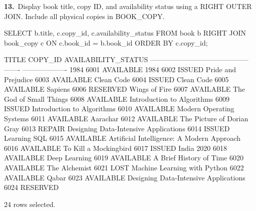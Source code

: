 \noindent\begin{minipage}{\linewidth}
\begingroup{}
{\fontsize{14}{17}\selectfont\textbf{13.}}\ Display book title, copy ID, and availability status using a RIGHT OUTER JOIN. Include all physical copies in BOOK\_COPY.\par
\endgroup\vspace{12pt}


\begin{sqlcode}
SELECT b.title, c.copy_id, c.availability_status
FROM book b
RIGHT JOIN book_copy c ON c.book_id = b.book_id
ORDER BY c.copy_id;
\end{sqlcode}

\vspace{18pt}


\begin{sqlout}[fontsize=\small]
TITLE                                       COPY_ID  AVAILABILITY_STATUS
------------------------------------------  -------  -------------------
1984                                           6001  AVAILABLE
1984                                           6002  ISSUED
Pride and Prejudice                            6003  AVAILABLE
Clean Code                                     6004  ISSUED
Clean Code                                     6005  AVAILABLE
Sapiens                                        6006  RESERVED
Wings of Fire                                  6007  AVAILABLE
The God of Small Things                        6008  AVAILABLE
Introduction to Algorithms                     6009  ISSUED
Introduction to Algorithms                     6010  AVAILABLE
Modern Operating Systems                       6011  AVAILABLE
Aarachar                                       6012  AVAILABLE
The Picture of Dorian Gray                     6013  REPAIR
Designing Data-Intensive Applications          6014  ISSUED
Learning SQL                                   6015  AVAILABLE
Artificial Intelligence: A Modern Approach     6016  AVAILABLE
To Kill a Mockingbird                          6017  ISSUED
India 2020                                     6018  AVAILABLE
Deep Learning                                  6019  AVAILABLE
A Brief History of Time                        6020  AVAILABLE
The Alchemist                                  6021  LOST
Machine Learning with Python                   6022  AVAILABLE
Qabar                                          6023  AVAILABLE
Designing Data-Intensive Applications          6024  RESERVED

24 rows selected.
\end{sqlout}
\end{minipage}\par\vspace{24pt}

